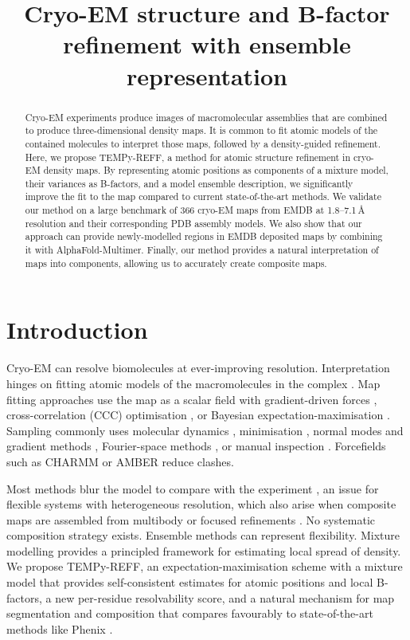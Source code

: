 \documentclass[11pt]{article}
\title{Cryo-EM structure and B-factor refinement with ensemble representation}
\author{}
\date{}
\begin{document}
\maketitle

\begin{abstract}
Cryo-EM experiments produce images of macromolecular assemblies that are combined to produce three-dimensional density maps. It is common to fit atomic models of the contained molecules to interpret those maps, followed by a density-guided refinement. Here, we propose TEMPy-REFF, a method for atomic structure refinement in cryo-EM density maps. By representing atomic positions as components of a mixture model, their variances as B-factors, and a model ensemble description, we significantly improve the fit to the map compared to current state-of-the-art methods. We validate our method on a large benchmark of 366 cryo-EM maps from EMDB at 1.8--7.1\,\AA{} resolution and their corresponding PDB assembly models. We also show that our approach can provide newly-modelled regions in EMDB deposited maps by combining it with AlphaFold-Multimer. Finally, our method provides a natural interpretation of maps into components, allowing us to accurately create composite maps.
\end{abstract}

\section{Introduction}
Cryo-EM can resolve biomolecules at ever-improving resolution. Interpretation hinges on fitting atomic models of the macromolecules in the complex \citep{r1,r2,r3}. Map fitting approaches use the map as a scalar field with gradient-driven forces \citep{r4,r5}, cross-correlation (CCC) optimisation \citep{r6}, or Bayesian expectation-maximisation \citep{r7,r8}. Sampling commonly uses molecular dynamics \citep{r4,r9}, minimisation \citep{r10}, normal modes and gradient methods \citep{r11,r12}, Fourier-space methods \citep{r2}, or manual inspection \citep{r13,r14,r15}. Forcefields such as CHARMM \citep{r16} or AMBER \citep{r17} reduce clashes.

Most methods blur the model to compare with the experiment \citep{r18}, an issue for flexible systems with heterogeneous resolution, which also arise when composite maps are assembled from multibody or focused refinements \citep{r19,r20}. No systematic composition strategy exists. Ensemble methods \citep{r21,r22,r23,r24,r25,r26} can represent flexibility. Mixture modelling \citep{r8} provides a principled framework for estimating local spread of density. We propose TEMPy-REFF, an expectation-maximisation scheme with a mixture model that provides self-consistent estimates for atomic positions and local B-factors, a new per-residue resolvability score, and a natural mechanism for map segmentation and composition that compares favourably to state-of-the-art methods like Phenix \citep{r27}.
\end{document}
